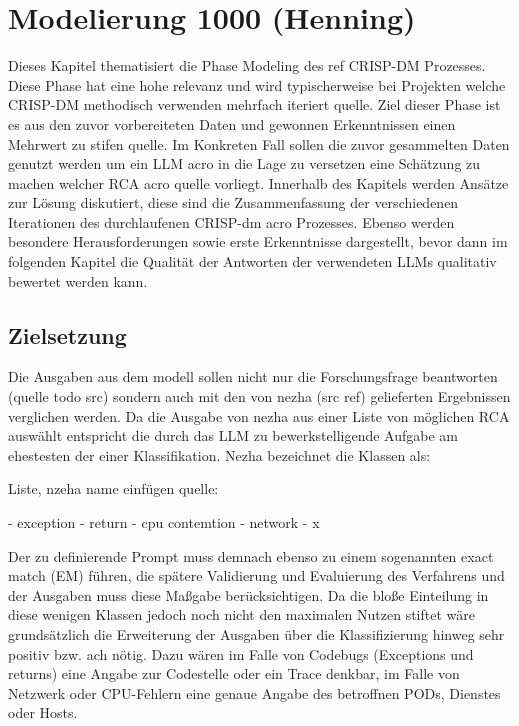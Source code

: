 \chapter{Modelierung 1000 (Henning)}
\label{sec:Kapitel3}

Dieses Kapitel thematisiert die Phase Modeling des ref CRISP-DM Prozesses. Diese Phase hat eine hohe relevanz und wird typischerweise bei Projekten welche CRISP-DM methodisch verwenden mehrfach iteriert quelle. Ziel dieser Phase ist es aus den zuvor vorbereiteten Daten und gewonnen Erkenntnissen einen Mehrwert zu stifen quelle. Im Konkreten Fall sollen die zuvor gesammelten Daten genutzt werden um ein LLM acro in die Lage zu versetzen eine Schätzung zu machen welcher RCA acro quelle vorliegt. Innerhalb des Kapitels werden Ansätze zur Lösung diskutiert, diese sind die Zusammenfassung der verschiedenen Iterationen des durchlaufenen CRISP-dm acro Prozesses. Ebenso werden besondere Herausforderungen sowie erste Erkenntnisse dargestellt, bevor dann im folgenden Kapitel die Qualität der Antworten der verwendeten LLMs qualitativ bewertet werden kann. 

\section{Zielsetzung}
\label{sec:Zielsetzung}

Die Ausgaben aus dem modell sollen nicht nur die Forschungsfrage beantworten (quelle todo src) sondern auch mit den von nezha (src ref) gelieferten Ergebnissen verglichen werden. Da die Ausgabe von nezha aus einer Liste von möglichen RCA auswählt entspricht die durch das LLM zu bewerkstelligende Aufgabe am ehestesten der einer Klassifikation. Nezha bezeichnet die Klassen als:

Liste, nzeha name einfügen quelle:

  - exception
  - return
  - cpu contemtion
  - network
  - x

  Der zu definierende Prompt muss demnach ebenso zu einem sogenannten exact match (EM) führen, die spätere Validierung und Evaluierung des Verfahrens und der Ausgaben muss diese Maßgabe berücksichtigen. Da die bloße Einteilung in diese wenigen Klassen jedoch noch nicht den maximalen Nutzen stiftet wäre grundsätzlich die Erweiterung der Ausgaben über die Klassifizierung hinweg sehr positiv bzw. ach nötig. Dazu wären im Falle von Codebugs (Exceptions und returns) eine Angabe zur Codestelle oder ein Trace denkbar, im Falle von Netzwerk oder CPU-Fehlern eine genaue Angabe des betroffnen PODs, Dienstes oder Hosts.

